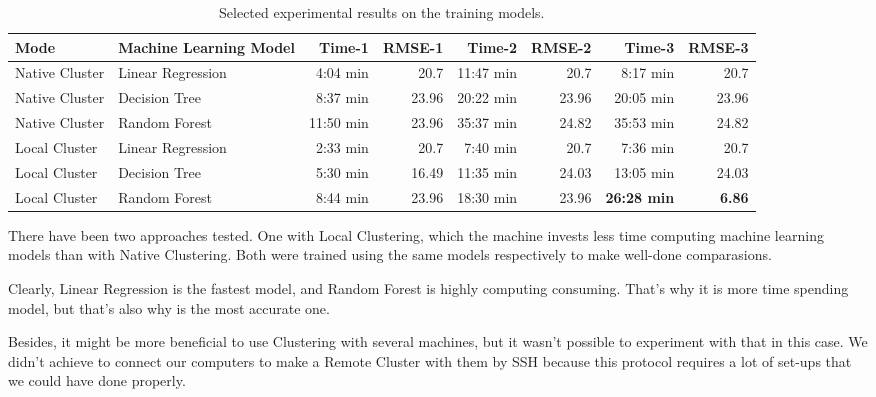\begin{table}[H]
	\centering
	\begin{tabular}{llrrrrrr}
		Mode & Machine Learning Model & Time-1 & RMSE-1 & Time-2 & RMSE-2 & Time-3 & RMSE-3
		\\ \hline \hline
		Native Cluster  & Linear Regression   &    4:04 min  &   20.7  &  11:47 min & 20.7 & 8:17 min & 20.7 \\   
		Native Cluster  & Decision Tree   &    8:37 min  &   23.96  &  20:22 min  &  23.96  & 20:05 min &  23.96\\   
		Native Cluster  & Random Forest   &   11:50 min &   23.96  &  35:37 min  & 24.82  & 35:53 min & 24.82 \\  \hline
		Local Cluster   & Linear Regression   &   2:33 min &   20.7  &  7:40 min  & 20.7 & 7:36 min  & 20.7   \\ 
		Local Cluster   & Decision Tree   &   5:30 min &   16.49  & 11:35 min & 24.03 & 13:05 min & 24.03  \\   
		Local Cluster   & Random Forest   &   8:44 min &   23.96  & 18:30 min & 23.96 & \textbf{26:28 min} & \textbf{6.86}  \\
		\hline \hline
	\end{tabular}
	\caption{Selected experimental results on the training models.}
	\label{tab:results}
\end{table}

There have been two approaches tested. One with Local Clustering, which the machine invests less time computing machine learning models than with Native Clustering. Both were trained using the same models respectively to make well-done comparasions.

Clearly, Linear Regression is the fastest model, and Random Forest is highly computing consuming. That's why it is more time spending model, but that's also why is the most accurate one.

Besides, it might be more beneficial to use Clustering with several machines, but it wasn't possible to experiment with that in this case. We didn't achieve to connect our computers to make a Remote Cluster with them by SSH because this protocol requires a lot of set-ups that we could have done properly.
